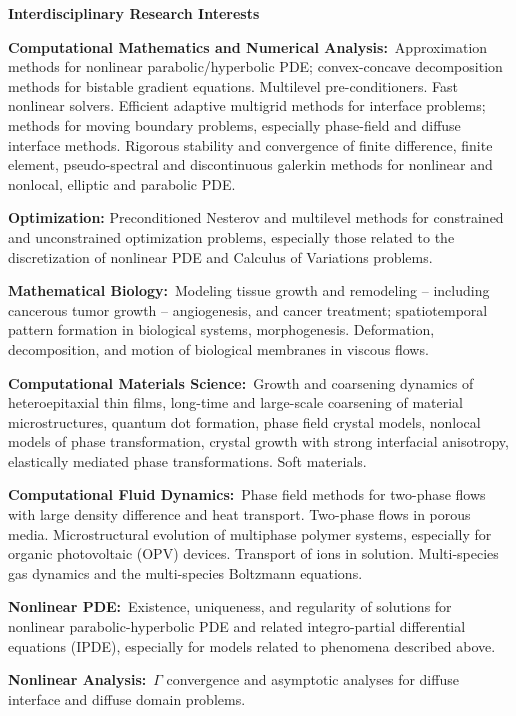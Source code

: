 \documentclass[11pt]{letter}
\begin{document}
    \smallskip
	
{\LARGE\bf Interdisciplinary  Research Interests}
    \begin{description}
    \item
\textbf{Computational Mathematics and Numerical Analysis:}~Approximation methods for nonlinear parabolic/hyperbolic PDE; convex-concave decomposition methods for bistable gradient equations. Multilevel pre-conditioners. Fast nonlinear solvers. Efficient adaptive multigrid methods for interface problems; methods for moving boundary problems, especially phase-field and diffuse interface methods. Rigorous stability and convergence of finite difference, finite element, pseudo-spectral and discontinuous galerkin methods for nonlinear and nonlocal, elliptic and parabolic PDE.
	\item
\textbf{Optimization:} Preconditioned Nesterov and multilevel methods for constrained and unconstrained optimization problems, especially those related to the discretization of nonlinear PDE and Calculus of Variations problems.

	\item
\textbf{Mathematical Biology:}~Modeling tissue growth and remodeling -- including cancerous tumor growth -- angiogenesis, and cancer treatment; spatiotemporal pattern formation in biological systems, morphogenesis.  Deformation, decomposition, and motion of biological membranes in viscous flows.
	\item
\textbf{Computational Materials Science:}~Growth and coarsening dynamics of heteroepitaxial thin films, long-time and large-scale coarsening of material microstructures, quantum dot formation, phase field crystal models, nonlocal models of phase transformation, crystal growth with strong interfacial anisotropy, elastically mediated phase transformations. Soft materials.
	\item
\textbf{Computational Fluid Dynamics:}~Phase field methods for two-phase flows with large density difference and heat transport. Two-phase flows in porous media. Microstructural evolution of multiphase polymer systems, especially for organic photovoltaic (OPV) devices. Transport of ions in solution. Multi-species gas dynamics and the multi-species Boltzmann equations.
	\item
\textbf{Nonlinear PDE:}~Existence, uniqueness, and regularity of solutions for nonlinear parabolic-hyperbolic PDE and related integro-partial differential equations (IPDE), especially for models related to phenomena described above.
	\item
\textbf{Nonlinear Analysis:}~$\Gamma$ convergence and asymptotic analyses for diffuse interface and diffuse domain problems.
    \end{description}
	
\end{document}
